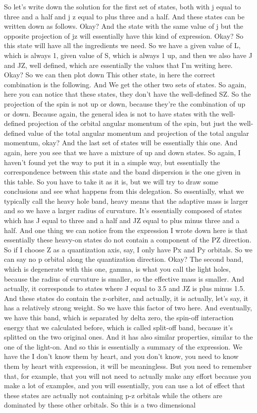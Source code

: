 So let's write down the solution for the first set of states, both with j equal to three and a half and j z equal to plus three and a half. And these states can be written down as follows. Okay? And the state with the same value of j but the opposite projection of jz will essentially have this kind of expression. Okay? So this state will have all the ingredients we need. So we have a given value of L, which is always 1, given value of S, which is always 1 up, and then we also have J and JZ, well defined, which are essentially the values that I'm writing here. Okay? So we can then plot down This other state, in here the correct combination is the following. And We get the other two sets of states. So again, here you can notice that these states, they don't have the well-defined SZ. So the projection of the spin is not up or down, because they're the combination of up or down. Because again, the general idea is not to have states with the well-defined projection of the orbital angular momentum of the spin, but just the well-defined value of the total angular momentum and projection of the total angular momentum, okay? And the last set of states will be essentially this one. And again, here you see that we have a mixture of up and down states. So again, I haven't found yet the way to put it in a simple way, but essentially the correspondence between this state and the band dispersion is the one given in this table. So you have to take it as it is, but we will try to draw some conclusions and see what happens from this delegation. So essentially, what we typically call the heavy hole band, heavy means that the adaptive mass is larger and so we have a larger radius of curvature. It's essentially composed of states which has J equal to three and a half and JZ equal to plus minus three and a half. And one thing we can notice from the expression I wrote down here is that essentially these heavy-on states do not contain a component of the PZ direction. So if I choose Z as a quantization axis, say, I only have Px and Py orbitals. So we can say no p orbital along the quantization direction. Okay? The second band, which is degenerate with this one, gamma, is what you call the light holes, because the radius of curvature is smaller, so the effective mass is smaller. And actually, it corresponds to states where J equal to 3.5 and JZ is plus minus 1.5. And these states do contain the z-orbiter, and actually, it is actually, let's say, it has a relatively strong weight. So we have this factor of two here. And eventually, we have this band, which is separated by delta zero, the spin-off interaction energy that we calculated before, which is called split-off band, because it's splitted on the two original ones. And it has also similar properties, similar to the one of the light-on. And so this is essentially a summary of the expression. We have the I don't know them by heart, and you don't know, you need to know them by heart with expression, it will be meaningless. But you need to remember that, for example, that you will not need to actually make any effort because you make a lot of examples, and you will essentially, you can use a lot of effect that these states are actually not containing p-z orbitals while the others are dominated by these other orbitals. So this is a two dimensional 